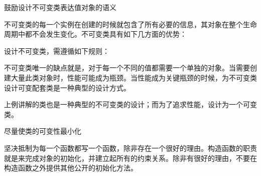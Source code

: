 \begin{content}

\begin{advise}
鼓励设计不可变类表达值对象的语义
\end{advise}

不可变类的每一个实例在创建的时候就包含了所有必要的信息，其对象在整个生命周期中都不会发生变化。不可变类具有如下几方面的优势：
\begin{enum}
\end{enum}

设计不可变类，需遵循如下规则：
\begin{enum}
\end{enum}

不可变类唯一的缺点就是，对于每一个不同的值都需要一个单独的对象。当需要创建大量此类对象时，性能可能成为瓶颈。当性能成为关键瓶颈的时候，为不可变类设计可变配套类是一种典型的设计方式。

上例讲解的类也是一种典型的不可变类的设计；而为了追求性能，设计为一个可变类。

\begin{regulation}
尽量使类的可变性最小化
\end{regulation}

坚决抵制为每一个函数都写一个函数，除非存在一个很好的理由。构造函数的职责就是来完成对象的初始化，并建立起所有的约束关系。除非有很好的理由，不要在构造函数之外提供其他公开的初始化方法。

\end{content}

